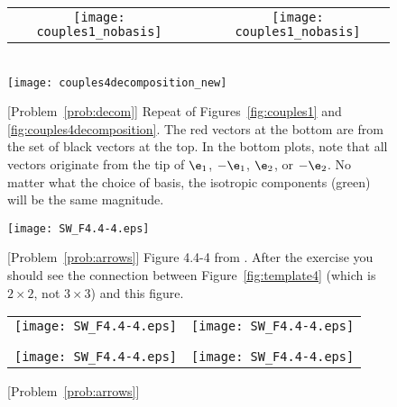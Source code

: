 \documentclass[11pt,titlepage,fleqn]{article}
\begin{document}
\begin{figure}
\centering
\begin{tabular}{ccc}
\texttt{[image: couples1\_nobasis]}
& \hspace{1.4cm} &
\texttt{[image: couples1\_nobasis]}
\end{tabular}
\\
\makebox{\hspace{0.5cm}}
\texttt{[image: couples4decomposition\_new]}
\caption{
[Problem~\ref{prob:decom}]
Repeat of Figures~\ref{fig:couples1} and \ref{fig:couples4decomposition}.
The red vectors at the bottom are from the set of black vectors at the top.
In the bottom plots, note that all vectors originate from the tip of $\e_1$, $-\e_1$, $\e_2$, or $-\e_2$.
No matter what the choice of basis, the isotropic components (green) will be the same magnitude.
\label{fig:decom}
}
\end{figure}


\begin{figure}
\centering
\texttt{[image: SW\_F4.4-4.eps]}
\caption{
[Problem~\ref{prob:arrows}]
Figure 4.4-4 from \citet{SteinWysession}.
After the exercise you should see the connection between Figure~\ref{fig:template4} (which is $2 \times 2$, not $3 \times 3$) and this figure.
\label{fig:SW}
}
\end{figure}

\begin{figure}
\hspace{-1cm}
\begin{tabular}{c|c}
\texttt{[image: SW\_F4.4-4.eps]} & \texttt{[image: SW\_F4.4-4.eps]} \\
& \\ \hline
& \\
\texttt{[image: SW\_F4.4-4.eps]} & \texttt{[image: SW\_F4.4-4.eps]} 
\end{tabular}
\caption{
[Problem~\ref{prob:arrows}]
\label{fig:SWfour}
}
\end{figure}

\clearpage\pagebreak



\end{document}
